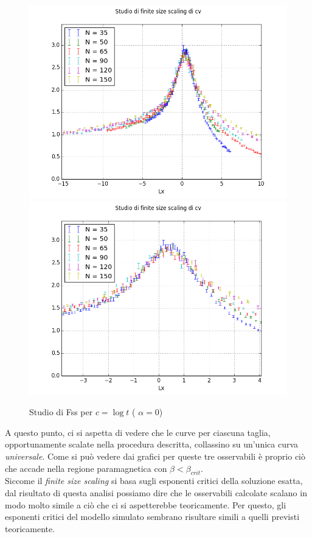 \begin{center}
	\begin{figure}[h]
		\centering
		\includegraphics[scale=0.6]{sw/fsscv.png}
		\includegraphics[scale=0.6]{sw/fsscvzoom.png}
		\caption{Studio di Fss per $c = \log{ t} $ ( $\alpha=0$)}
	\end{figure}
\end{center}


A questo punto, ci si aspetta di vedere che le curve per ciascuna taglia, opportunamente scalate nella procedura descritta, collassino su un'unica curva \emph{universale}.
Come si può vedere dai grafici per queste tre osservabili è proprio ciò che accade nella regione paramagnetica con $\beta < \beta_{crit}$.\\
Siccome il \emph{finite size scaling} si basa sugli esponenti critici della soluzione esatta, dal risultato di questa analisi possiamo dire che le osservabili calcolate scalano in modo molto simile a ciò che ci si aspetterebbe teoricamente.
Per questo, gli esponenti critici del modello simulato sembrano risultare simili a quelli previsti teoricamente.

